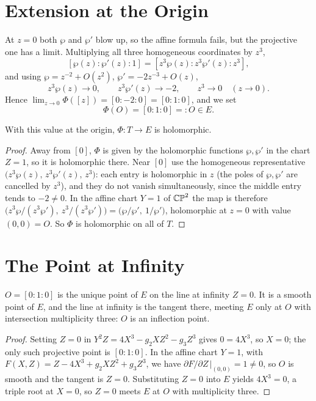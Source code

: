 \section{Extension at the Origin}
\label{sec:emb-origin}

At \(z = 0\) both \(\wp\) and \(\wp'\) blow up, so the affine formula fails, but
the projective one has a limit. Multiplying all three homogeneous coordinates by
\(z^3\),
\[
  [\wp(z) : \wp'(z) : 1] = [z^3\wp(z) : z^3\wp'(z) : z^3],
\]
and using \(\wp = z^{-2} + O(z^2)\), \(\wp' = -2z^{-3} + O(z)\),
\[
  z^3\wp(z) \to 0, \qquad z^3\wp'(z) \to -2, \qquad z^3 \to 0
  \quad (z \to 0).
\]
Hence \(\lim_{z\to0}\Phi([z]) = [0 : -2 : 0] = [0:1:0]\), and we set
\[
  \Phi(O) = [0:1:0] =: O \in E .
\]

\begin{proposition}
\label{prop:emb-holo}
With this value at the origin, \(\Phi : T \to E\) is holomorphic.
\end{proposition}

\begin{proof}
Away from \([0]\), \(\Phi\) is given by the holomorphic functions \(\wp, \wp'\) in
the chart \(Z = 1\), so it is holomorphic there. Near \([0]\) use the homogeneous
representative \(\bigl(z^3\wp(z),\, z^3\wp'(z),\, z^3\bigr)\): each entry is
holomorphic in \(z\) (the poles of \(\wp, \wp'\) are cancelled by \(z^3\)), and
they do not vanish simultaneously, since the middle entry tends to \(-2 \ne 0\).
In the affine chart \(Y = 1\) of \(\mathbb{CP}^2\) the map is therefore
\(\bigl(z^3\wp/(z^3\wp'),\ z^3/(z^3\wp')\bigr) = \bigl(\wp/\wp',\ 1/\wp'\bigr)\),
holomorphic at \(z = 0\) with value \((0,0) = O\). So \(\Phi\) is holomorphic on
all of \(T\).
\end{proof}

\section{The Point at Infinity}
\label{sec:emb-infinity}

\begin{proposition}
\label{prop:emb-flex}
\(O = [0:1:0]\) is the unique point of \(E\) on the line at infinity \(Z = 0\). It
is a smooth point of \(E\), and the line at infinity is the tangent there, meeting
\(E\) only at \(O\) with intersection multiplicity three: \(O\) is an inflection
point.
\end{proposition}

\begin{proof}
Setting \(Z = 0\) in \(Y^2 Z = 4X^3 - g_2 X Z^2 - g_3 Z^3\) gives \(0 = 4X^3\), so
\(X = 0\); the only such projective point is \([0:1:0]\). In the affine chart
\(Y = 1\), with \(F(X,Z) = Z - 4X^3 + g_2 X Z^2 + g_3 Z^3\), we have
\(\partial F/\partial Z\,|_{(0,0)} = 1 \ne 0\), so \(O\) is smooth and the tangent
is \(Z = 0\). Substituting \(Z = 0\) into \(E\) yields \(4X^3 = 0\), a triple root
at \(X = 0\), so \(Z = 0\) meets \(E\) at \(O\) with multiplicity three.
\end{proof}

